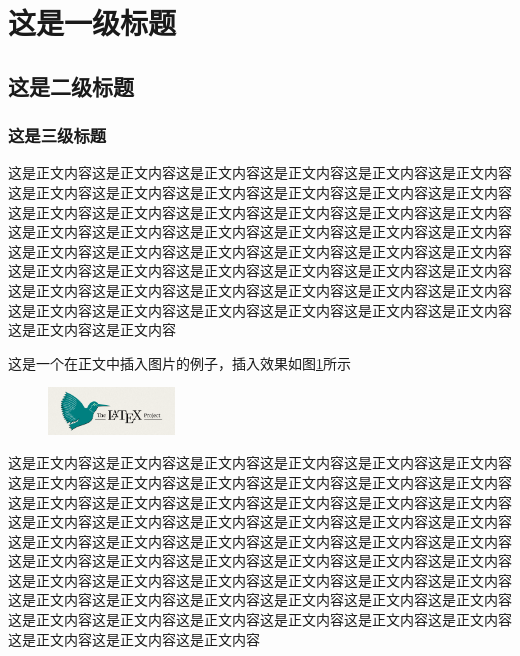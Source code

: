 \documentclass{bjfu}
\begin{document}
\makeBjfuTitlePage


\section{这是一级标题}
\subsection{这是二级标题}
\subsubsection{这是三级标题}
这是正文内容这是正文内容这是正文内容这是正文内容这是正文内容这是正文内容这是正文内容这是正文内容这是正文内容这是正文内容这是正文内容这是正文内容这是正文内容这是正文内容这是正文内容这是正文内容这是正文内容这是正文内容这是正文内容这是正文内容这是正文内容这是正文内容这是正文内容这是正文内容这是正文内容这是正文内容这是正文内容这是正文内容这是正文内容这是正文内容这是正文内容这是正文内容这是正文内容这是正文内容这是正文内容这是正文内容这是正文内容这是正文内容这是正文内容这是正文内容这是正文内容这是正文内容这是正文内容这是正文内容这是正文内容这是正文内容这是正文内容这是正文内容这是正文内容这是正文内容

这是一个在正文中插入图片的例子，插入效果如图\ref{Fig:test}所示
\begin{figure}[htbp] %
    \centering %
    \includegraphics[width=0.3\textwidth]{images/test.png} %
    \label{Fig:test} %
\end{figure}

这是正文内容这是正文内容这是正文内容这是正文内容这是正文内容这是正文内容这是正文内容这是正文内容这是正文内容这是正文内容这是正文内容这是正文内容这是正文内容这是正文内容这是正文内容这是正文内容这是正文内容这是正文内容这是正文内容这是正文内容这是正文内容这是正文内容这是正文内容这是正文内容这是正文内容这是正文内容这是正文内容这是正文内容这是正文内容这是正文内容这是正文内容这是正文内容这是正文内容这是正文内容这是正文内容这是正文内容这是正文内容这是正文内容这是正文内容这是正文内容这是正文内容这是正文内容这是正文内容这是正文内容这是正文内容这是正文内容这是正文内容这是正文内容这是正文内容这是正文内容这是正文内容这是正文内容这是正文内容这是正文内容这是正文内容这是正文内容这是正文内容
\end{document}
